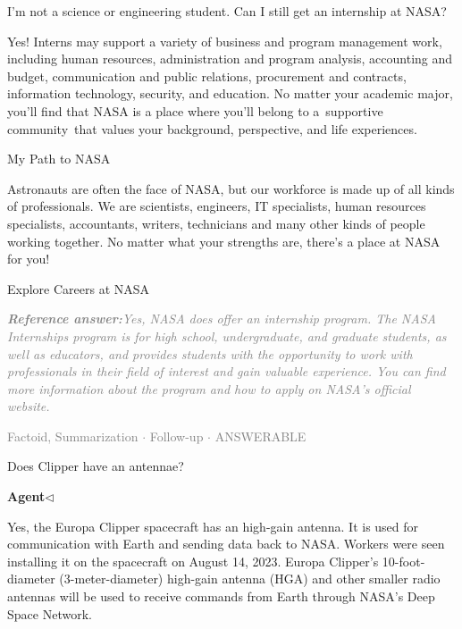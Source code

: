 \documentclass[a4paper,11pt]{article}
\begin{document}
\begin{docenv}
{ 

I'm not a science or engineering student. Can I still get an internship at NASA?

Yes! Interns may support a variety of business and program management work, including human resources, administration and program analysis, accounting and budget, communication and public relations, procurement and contracts, information technology, security, and education. No matter your academic major, you’ll find that NASA is a place where you’ll belong to a supportive community that values your background, perspective, and life experiences.

 

My Path to NASA

Astronauts are often the face of NASA, but our workforce is made up of all kinds of professionals. We are scientists, engineers, IT specialists, human resources specialists, accountants, writers, technicians and many other kinds of people working together. No matter what your strengths are, there's a place at NASA for you!

	Explore Careers at NASA}
\end{docenv}
\begin{refanswerenv}
{\footnotesize\textit{\textcolor{gray}{\textbf{Reference answer:}\enspace Yes, NASA does offer an internship program. The NASA Internships program is for high school, undergraduate, and graduate students, as well as educators, and provides students with the opportunity to work with professionals in their field of interest and gain valuable experience. You can find more information about the program and how to apply on NASA's official website.}}}
\end{refanswerenv}
\vspace{0.5em}
\hfill{\tiny\textcolor{gray}{Factoid, Summarization $\cdot$ Follow-up $\cdot$ ANSWERABLE}}
\begin{userbubble}
Does Clipper have an antennae?
\end{userbubble}
\noindent\hfill{\small\textcolor{agentcolor}{\textbf{Agent\enspace$\triangleleft$}}}
\begin{agentbubble}
Yes, the Europa Clipper spacecraft has an high-gain antenna. It is used for communication with Earth and sending data back to NASA. Workers were seen installing it on the spacecraft on August 14, 2023. Europa Clipper’s 10-foot-diameter (3-meter-diameter) high-gain antenna (HGA) and other smaller radio antennas will be used to receive commands from Earth through NASA’s Deep Space Network. 
\end{agentbubble}
\end{document}
